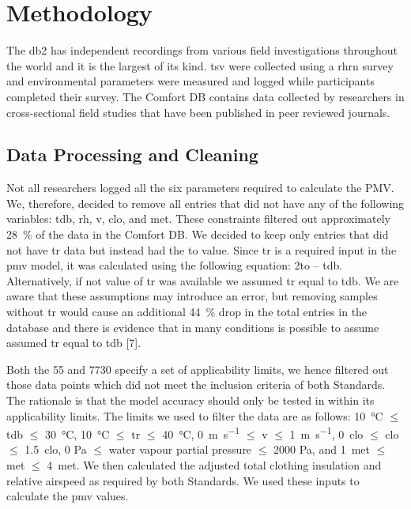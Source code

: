 

\section{Methodology}\label{sec:methodology}

The \gls{db2} has  independent recordings from various field investigations throughout the world and it is the largest of its kind.
\Ac{tsv} were collected using a \gls{rhrn} survey and environmental parameters were measured and logged while participants completed their survey.
The Comfort DB contains data collected by researchers in cross-sectional field studies that have been published in peer reviewed journals.

\subsection{Data Processing and Cleaning}\label{subsec:data-processing-and-cleaning}
Not all researchers logged all the six parameters required to calculate the PMV.\@
We, therefore, decided to remove all entries that did not have any of the following variables: \ac{tdb}, \ac{rh}, \ac{v}, \ac{clo}, and \ac{met}.
These constraints filtered out approximately \qty{28}{\percent} of the data in the Comfort DB.\@  %
We decided to keep only entries that did not have \ac{tr} data but instead had the \ac{to} value.
Since \ac{tr} is a required input in the \ac{pmv} model, it was calculated using the following equation: 2\ac{to} – \ac{tdb}.
Alternatively, if not value of \ac{tr} was available we assumed \ac{tr} equal to \ac{tdb}.
We are aware that these assumptions may introduce an error, but removing samples without \ac{tr} would cause an additional \qty{44}{\percent} drop in the total entries in the database and there is evidence that in many conditions is possible to assume assumed \ac{tr} equal to tdb [7].  %

Both the \gls{55} and \gls{7730} specify a set of applicability limits, we hence filtered out those data points which did not meet the inclusion criteria of both Standards.
The rationale is that the model accuracy should only be tested in within its applicability limits.
The limits we used to filter the data are as follows: \qty{10}{\celsius} $\leq$ \ac{tdb} $\leq$ \qty{30}{\celsius}, \qty{10}{\celsius} $\leq$ \ac{tr} $\leq$ \qty{40}{\celsius}, \qty{0}{\m\per\s} $\leq$ \ac{v} $\leq$ \qty{1}{\m\per\s}, \qty{0}{clo} $\leq$ \ac{clo} $\leq$ \qty{1.5}{clo}, 0 Pa $\leq$ water vapour partial pressure $\leq$ 2000 Pa, and \qty{1}{met} $\leq$ \ac{met} $\leq$ \qty{4}{met}.
We then calculated the adjusted total clothing insulation and relative airspeed as required by both Standards.
We used these inputs to calculate the \ac{pmv} values.  %

